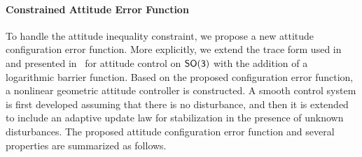 \paragraph{Constrained Attitude Error Function}
To handle the attitude inequality constraint, we propose a new attitude configuration error function. 
More explicitly, we extend the trace form used in~\cite{bullo2004,lee2013b,kulumani2017a} and presented in~ for attitude control on \(\mathsf{SO(3)}\) with the addition of a logarithmic barrier function. 
Based on the proposed configuration error function, a nonlinear geometric attitude controller is constructed. 
A smooth control system is first developed assuming that there is  no disturbance, and then it is extended to include an adaptive update law for stabilization in the presence of unknown disturbances. 
The proposed attitude configuration error function and several properties are summarized as follows.
